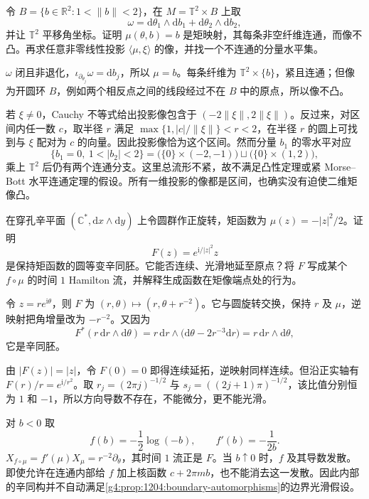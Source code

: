 \begin{exercise}\label{g4:ex:12:noncompact-annular-image}
	令 \(B=\{b\in\mathbb R^2:1<\|b\|<2\}\)，在 \(M=\mathbb T^2\times B\) 上取
	\[
		\omega=\mathrm d\theta_1\wedge\mathrm db_1
		+\mathrm d\theta_2\wedge\mathrm db_2,
	\]
	并让 \(\mathbb T^2\) 平移角坐标。证明 \(\mu(\theta,b)=b\) 是矩映射，其每条非空纤维连通，而像不凸。再求任意非零线性投影 \(\langle\mu,\xi\rangle\) 的像，并找一个不连通的分量水平集。
\end{exercise}
\begin{solution}
	\(\omega\) 闭且非退化，\(\iota_{\partial_{\theta_j}}\omega=\mathrm db_j\)，所以 \(\mu=b\)。每条纤维为 \(\mathbb T^2\times\{b\}\)，紧且连通；但像为开圆环 \(B\)，例如两个相反点之间的线段经过不在 \(B\) 中的原点，所以像不凸。

	若 \(\xi\neq0\)，Cauchy 不等式给出投影像包含于 \((-2\|\xi\|,2\|\xi\|)\)。反过来，对区间内任一数 \(c\)，取半径 \(r\) 满足 \(\max\{1,|c|/\|\xi\|\}<r<2\)，在半径 \(r\) 的圆上可找到与 \(\xi\) 配对为 \(c\) 的向量。因此投影像恰为这个区间。然而分量 \(b_1\) 的零水平对应
	\[
		\{b_1=0,\ 1<|b_2|<2\}
		=\bigl(\{0\}\times(-2,-1)\bigr)
		\sqcup\bigl(\{0\}\times(1,2)\bigr),
	\]
	乘上 \(\mathbb T^2\) 后仍有两个连通分支。这里总流形不紧，故不满足凸性定理或紧 Morse–Bott 水平连通定理的假设。所有一维投影的像都是区间，也确实没有迫使二维矩像凸。
\end{solution}

\begin{exercise}\label{g4:ex:12:boundary-phase}
	在穿孔辛平面 \((\mathbb C^*,\mathrm{d}x\wedge\mathrm{d}y)\) 上令圆群作正旋转，矩函数为 \(\mu(z)=-|z|^2/2\)。证明
	\[
		F(z)=e^{\mathrm{i}/|z|^2}z
	\]
	是保持矩函数的圆等变辛同胚。它能否连续、光滑地延至原点？将 \(F\) 写成某个 \(f\circ\mu\) 的时间 \(1\) Hamilton 流，并解释生成函数在矩像端点处的行为。
\end{exercise}
\begin{solution}
	令 \(z=re^{\mathrm{i}\theta}\)，则 \(F\) 为 \((r,\theta)\mapsto(r,\theta+r^{-2})\)。它与圆旋转交换，保持 \(r\) 及 \(\mu\)，逆映射把角增量改为 \(-r^{-2}\)。又因为
	\[
		F^*(r\,\mathrm{d}r\wedge\mathrm{d}\theta)
		=r\,\mathrm{d}r\wedge\bigl(\mathrm{d}\theta-2r^{-3}\mathrm{d}r\bigr)
		=r\,\mathrm{d}r\wedge\mathrm{d}\theta,
	\]
	它是辛同胚。

	由 \(|F(z)|=|z|\)，令 \(F(0)=0\) 即得连续延拓，逆映射同样连续。但沿正实轴有 \(F(r)/r=e^{\mathrm{i}/r^2}\)。取 \(r_j=(2\pi j)^{-1/2}\) 与 \(s_j=((2j+1)\pi)^{-1/2}\)，该比值分别恒为 \(1\) 和 \(-1\)，所以方向导数不存在，不能微分，更不能光滑。

	对 \(b<0\) 取
	\[
		f(b)=-\frac12\log(-b),\qquad f'(b)=-\frac1{2b}.
	\]
	\(X_{f\circ\mu}=f'(\mu)X_\mu=r^{-2}\partial_\theta\)，其时间 \(1\) 流正是 \(F\)。当 \(b\uparrow0\) 时，\(f\) 及其导数发散。即使允许在连通内部给 \(f\) 加上核函数 \(c+2\pi mb\)，也不能消去这一发散。因此内部的辛同构并不自动满足\cref{g4:prop:1204:boundary-automorphisms}的边界光滑假设。
\end{solution}

